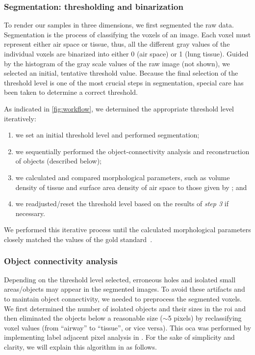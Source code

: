 \subsubsection{Segmentation: thresholding and binarization}
To render our samples in three dimensions, we first segmented the raw data. Segmentation is the process of classifying the voxels of an image. Each voxel must represent either air space or tissue, thus, all the different gray values of the individual voxels are binarized into either 0 (air space) or 1 (lung tissue). Guided by the histogram of the gray scale values of the raw image (not shown), we selected an initial, tentative threshold value. Because the final selection of the threshold level is one of the most crucial steps in segmentation, special care has been taken to determine a correct threshold.

As indicated in \autoref{fig:workflow}, we determined the appropriate threshold level iteratively: 
\begin{enumerate}
	\item we set an initial threshold level and performed segmentation;
	\item we sequentially performed the object-connectivity analysis and \threed reconstruction of objects (described below);
	\item we calculated and compared morphological parameters, such as volume density of tissue and surface area density of air space to those given by \citet{Tschanz2003}; and
	\item we readjusted/reset the threshold level based on the results of \textit{step 3} if necessary.
\end{enumerate}

We performed this iterative process until the calculated morphological parameters closely matched the values of the gold standard~\cite{Tschanz2003}.

\subsubsection{Object connectivity analysis}
Depending on the threshold level selected, erroneous holes and isolated small areas/objects may appear in the segmented images. To avoid these artifacts and to maintain object connectivity, we needed to preprocess the segmented voxels. We first determined the number of isolated objects and their sizes in the \ac{roi} and then eliminated the objects below a reasonable size ($\sim$5 pixels) by reclassifying voxel values (from ``airway'' to ``tissue'', or vice versa). This \ac{oca} was performed by implementing label adjacent pixel analysis in \threed \cite{Ballard1982,Davies1990,Gonzalez1992}. For the sake of simplicity and clarity, we will explain this algorithm in \twod as follows.

